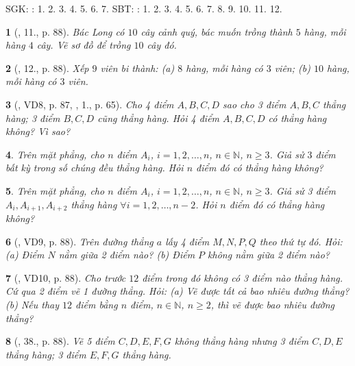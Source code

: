 \documentclass{article}
\newtheorem{baitoan}{}
\begin{document}
\noindent SGK: \cite[\S1, p. 79]{SGK_Toan_6_Canh_Dieu_tap_1}: 1. 2. 3. 4. 5. 6. 7. SBT: \cite{SBT_Toan_6_Canh_Dieu_tap_2}: 1. 2. 3. 4. 5. 6. 7. 8. 9. 10. 11. 12.

\begin{baitoan}[\cite{SBT_Toan_6_Canh_Dieu_tap_2}, 11., p. 88]
	Bác Long có $10$ cây cảnh quý, bác muốn trồng thành $5$ hàng, mỗi hàng $4$ cây. Vẽ sơ đồ để trồng $10$ cây đó.
\end{baitoan}

\begin{baitoan}[\cite{SBT_Toan_6_Canh_Dieu_tap_2}, 12., p. 88]
	Xếp $9$ viên bi thành: (a) $8$ hàng, mỗi hàng có $3$ viên; (b) $10$ hàng, mỗi hàng có $3$ viên.
\end{baitoan}

\begin{baitoan}[\cite{Tuyen_Toan_6}, VD8, p. 87, \cite{Binh_Toan_6_tap_2}, 1., p. 65]
	Cho 4 điểm $A,B,C,D$ sao cho 3 điểm $A,B,C$ thẳng hàng; 3 điểm $B,C,D$ cũng thẳng hàng. Hỏi 4 điểm $A,B,C,D$ có thẳng hàng không? Vì sao?
\end{baitoan}

\begin{baitoan}
	Trên mặt phẳng, cho $n$ điểm $A_i$, $i = 1,2,\ldots,n$, $n\in\mathbb{N}$, $n\ge3$. Giả sử $3$ điểm bất kỳ trong số chúng đều thẳng hàng. Hỏi $n$ điểm đó có thẳng hàng không?
\end{baitoan}

\begin{baitoan}
	Trên mặt phẳng, cho $n$ điểm $A_i$, $i = 1,2,\ldots,n$, $n\in\mathbb{N}$, $n\ge3$. Giả sử 3 điểm $A_i,A_{i+1},A_{i+2}$ thẳng hàng $\forall i = 1,2,\ldots,n-2$. Hỏi $n$ điểm đó có thẳng hàng không?
\end{baitoan}

\begin{baitoan}[\cite{Tuyen_Toan_6}, VD9, p. 88]
	Trên đường thẳng $a$ lấy 4 điểm $M,N,P,Q$ theo thứ tự đó. Hỏi: (a) Điểm $N$ nằm giữa 2 điểm nào? (b) Điểm $P$ không nằm giữa 2 điểm nào?
\end{baitoan}

\begin{baitoan}[\cite{Tuyen_Toan_6}, VD10, p. 88]
	Cho trước $12$ điểm trong đó không có 3 điểm nào thẳng hàng. Cứ qua 2 điểm vẽ 1 đường thẳng. Hỏi: (a) Vẽ được tất cả bao nhiêu đường thẳng? (b) Nếu thay $12$ điểm bằng $n$ điểm, $n\in\mathbb{N}$, $n\ge2$, thì vẽ được bao nhiêu đường thẳng?
\end{baitoan}

\begin{baitoan}[\cite{Tuyen_Toan_6}, 38., p. 88]
	Vẽ 5 điểm $C,D,E,F,G$ không thẳng hàng nhưng 3 điểm $C,D,E$ thẳng hàng; 3 điểm $E,F,G$ thẳng hàng.
\end{baitoan}
\end{document}
